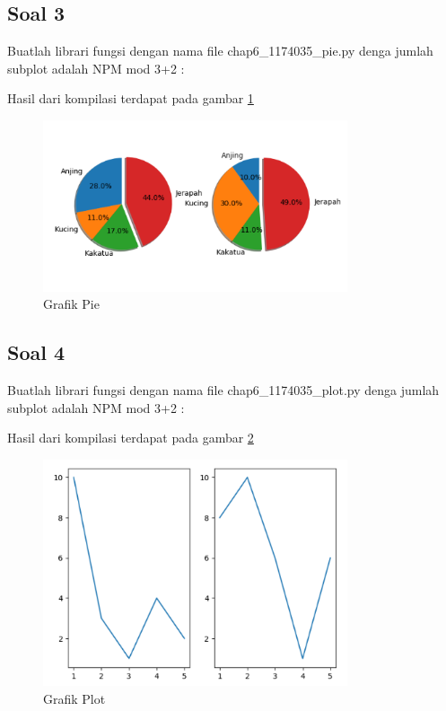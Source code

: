 	\subsection{Soal 3}

	Buatlah librari fungsi dengan nama file chap6\_1174035\_pie.py denga jumlah subplot adalah NPM mod 3+2 : 

	
	
	Hasil dari kompilasi terdapat pada gambar \ref{1174035_Pie}
	\begin{figure}[ht]
		\centerline{\includegraphics[width=0.8\textwidth]{figures/6/1174035/Praktek/Pie.png}}
		\caption{Grafik Pie}
		\label{1174035_Pie}
	\end{figure}
	\subsection{Soal 4}

	Buatlah librari fungsi dengan nama file chap6\_1174035\_plot.py denga jumlah subplot adalah NPM mod 3+2 : 

	
	
	Hasil dari kompilasi terdapat pada gambar \ref{1174035_Plot}
	\begin{figure}[ht]
		\centerline{\includegraphics[width=0.8\textwidth]{figures/6/1174035/Praktek/Plot.png}}
		\caption{Grafik Plot}
		\label{1174035_Plot}
	\end{figure}
